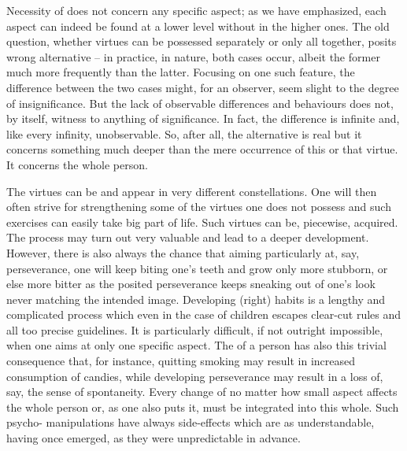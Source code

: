 Necessity of  does not concern any specific aspect; as
we have emphasized, each aspect can indeed be found at a lower level without
 in the higher ones.  The old question, whether virtues
can be possessed separately or only all together, posits wrong alternative -- in
practice, in nature, both cases occur, albeit the former much more frequently
than the latter.  Focusing on one such feature, the difference between the two
cases might, for an  observer, seem slight to the degree of
insignificance. But the lack of  observable differences and
behaviours does not, by itself, witness to anything of significance. In fact,
the difference is infinite and, like every infinity, 
unobservable. So, after all, the alternative is real but it concerns something
much deeper than the mere occurrence of this or that virtue. It concerns the whole
person. 

The  virtues can be  and appear in very different
constellations.  One will then often strive for strengthening some of the
virtues one does not possess and such exercises can easily take big part of
life. Such virtues can be, piecewise, acquired. The process may turn out very
valuable and lead to a deeper development. However, there is also always the
chance that aiming particularly at, say, perseverance, one will keep biting
one's teeth and grow only more stubborn, or else more bitter as the posited
perseverance keeps sneaking out of one's  look never matching the
intended image. Developing (right) habits is a lengthy and complicated process
which even in the case of children escapes clear-cut rules and all too precise
guidelines. It is particularly difficult, if not outright impossible, when one
aims at only one specific aspect. The  of a person has also this
trivial consequence that, for instance, quitting smoking may result in increased
consumption of candies, while developing perseverance may result in a loss of,
say, the sense of spontaneity. Every change of no matter how small aspect
affects the whole person or, as one also puts it, must be integrated into this
whole. Such psycho- manipulations have always side-effects which are
as understandable, having once emerged, as they were unpredictable in advance.

